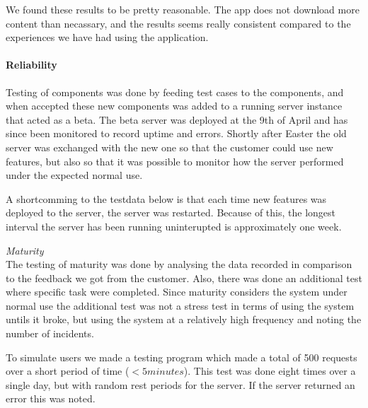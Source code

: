 We found these results to be pretty reasonable. The app does not download more content than necassary, and the results seems really consistent compared to the experiences we have had using the application.

\paragraph{Reliability}

Testing of components was done by feeding test cases to the components, and when accepted these new components was added to a running server instance that acted as a beta. The beta server was deployed at the 9th of April and has since been monitored to record uptime and errors. Shortly after Easter the old server was exchanged with the new one so that the customer could use new features, but also so that it was possible to monitor how the server performed under the expected normal use.

A shortcomming to the testdata below is that each time new features was deployed to the server, the server was restarted. Because of this, the longest interval the server has been running uninterupted is approximately one week. 

\emph{Maturity}\\
The testing of maturity was done by analysing the data recorded in comparison to the feedback we got from the customer. Also, there was done an additional  test where specific task were completed. Since maturity considers the system under normal use the additional test was not a stress test in terms of using the system untils it broke, but using the system at a relatively high frequency and noting the number of incidents.

To simulate users we made a testing program which made a total of 500 requests over a short period of time ($<5 minutes$). This test was done eight times over a single day, but with random rest periods for the server.  If the server returned an error this was noted. 

